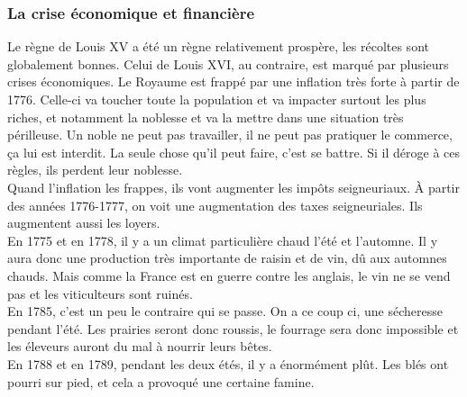 \documentclass[10pt, a4paper, openany]{book}
\begin{document}
\subsubsection{La crise économique et financière}

Le règne de Louis XV a été un règne relativement prospère, les récoltes sont globalement bonnes. Celui de Louis XVI, au contraire, est marqué par plusieurs crises économiques. Le Royaume est frappé par une inflation très forte à partir de 1776. Celle-ci va toucher toute la population et va impacter surtout les plus riches, et notamment la noblesse et va la mettre dans une situation très périlleuse. Un noble ne peut pas travailler, il ne peut pas pratiquer le commerce, ça lui est interdit. La seule chose qu'il peut faire, c'est se battre. Si il déroge à ces règles, ils perdent leur noblesse. \\
Quand l'inflation les frappes, ils vont augmenter les impôts seigneuriaux. À partir des années 1776-1777, on voit une augmentation des taxes seigneuriales. Ils augmentent aussi les loyers. \\
En 1775 et en 1778, il y a un climat particulière chaud l'été et l'automne. Il y aura donc une production très importante de raisin et de vin, dû aux automnes chauds. Mais comme la France est en guerre contre les anglais, le vin ne se vend pas et les viticulteurs sont ruinés. \\
En 1785, c'est un peu le contraire qui se passe. On a ce coup ci, une sécheresse pendant l'été. Les prairies seront donc roussis, le fourrage sera donc impossible et les éleveurs auront du mal à nourrir leurs bêtes. \\
En 1788 et en 1789, pendant les deux étés, il y a énormément plût. Les blés ont pourri sur pied, et cela a provoqué une certaine famine. 
\end{document}
